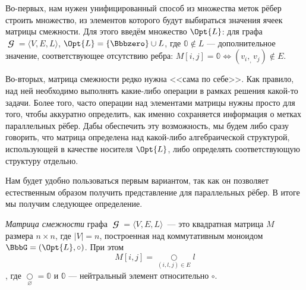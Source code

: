 Во-первых, нам нужен унифицированный способ из множества меток рёбер строить множество, из элементов которого будут выбираться значения ячеек матрицы смежности.
Для этого введём множество $\Opt{L}$: для графа $\mbfscrG = \langle V, E, L \rangle$, $\Opt{L}=\{\Bbbzero\} \cup L$, где $\Bbbzero \notin L$ --- дополнительное значение, соответствующее отсутствию ребра: $M[i,j] = \Bbbzero \iff (v_i, _ ,v_j) \notin E$.

Во-вторых, матрица смежности редко нужна <<сама по себе>>.
Как правило, над ней необходимо выполнять какие-либо операции в рамках решения какой-то задачи.
Более того, часто операции над элементами матрицы нужны просто для того, чтобы аккуратно определить, как именно сохраняется информация о метках параллельных рёбер.
Дабы обеспечить эту возможность, мы будем либо сразу говорить, что матрица определена над какой-либо алгебраической структурой, использующей в качестве носителя $\Opt{L}$, либо определять соответствующую структуру отдельно.

Нам будет удобно пользоваться первым вариантом, так как он позволяет естественным образом получить представление для параллельных рёбер.
В итоге мы получим следующее определение.

\begin{definition}
    \emph{Матрица смежности} графа $\mbfscrG = \langle V, E, L \rangle$~--- это квадратная матрица $M$ размера $n \times n$, где $|V| = n$, построенная над коммутативным моноидом $\BbbG = (\Opt{L}, \circ)$.
    При этом \[M[i,j] = \underset{{(i, l, j) \in E}}{\bigcirc} l\], где $\underset{\varnothing}{\bigcirc} = \Bbbzero$ и $\Bbbzero$ --- нейтральный элемент относительно $\circ$.
\end{definition}

